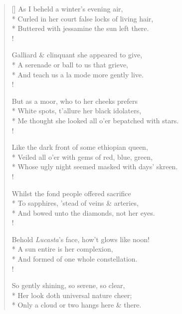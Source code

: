 \documentclass[MAIN]{subfiles}
\begin{document}
\settowidth{\versewidth}{Curled in her court false locks of living hair,}
\begin{verse}[\versewidth]
As I beheld a winter's evening air,\\*
Curled in her court false locks of living hair,\\*
Buttered with jessamine the sun left there.\\!

Galliard \& clinquant she appeared to give,\\*
A serenade or ball to us that grieve,\\*
And teach us {\hge a la mode} more gently live.\\!

But as a moor, who to her cheeks prefers\\*
White spots, t'allure her black idolaters,\\ *
Me thought she looked all o'er bepatched with stars.\\!

Like the dark front of some ethiopian queen,\\*
Veiled all o'er with gems of red, blue, green,\\*
Whose ugly night seemed masked with days' skreen.\\!

Whilst the fond people offered sacrifice\\* 
To sapphires, 'stead of veins \& arteries,\\*
And bowed unto the diamonds, not her eyes.\\!

Behold \emph{Lucasta}'s face, how't glows like noon!\\*
A sun entire is her complexion,\\*
And formed of one whole constellation.\\!

So gently shining, so serene, so clear,\\*
Her look doth universal nature cheer;\\*
Only a cloud or two hangs here \& there.
\end{verse}
\end{document}
